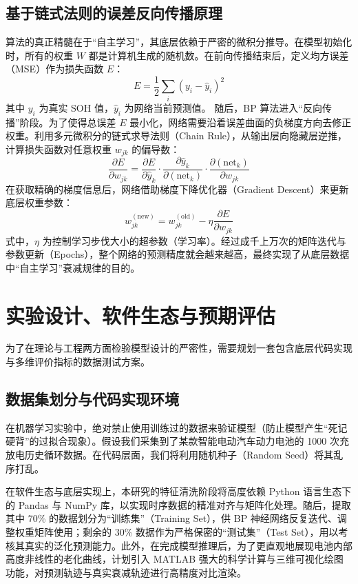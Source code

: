 \documentclass[10pt, a4paper, twocolumn]{ctexart}
\begin{document}
\subsection{基于链式法则的误差反向传播原理}
算法的真正精髓在于“自主学习”，其底层依赖于严密的微积分推导。在模型初始化时，所有的权重 $W$ 都是计算机生成的随机数。在前向传播结束后，定义均方误差（MSE）作为损失函数 $E$：
\begin{equation}
    E = \frac{1}{2} \sum_{i} (y_i - \hat{y}_i)^2 
\end{equation}
其中 $y_i$ 为真实 SOH 值，$\hat{y}_i$ 为网络当前预测值。
随后，BP 算法进入“反向传播”阶段。为了使得总误差 $E$ 最小化，网络需要沿着误差曲面的负梯度方向去修正权重。利用多元微积分的链式求导法则（Chain Rule），从输出层向隐藏层逆推，计算损失函数对任意权重 $w_{jk}$ 的偏导数：
\begin{equation}
    \frac{\partial E}{\partial w_{jk}} = \frac{\partial E}{\partial \hat{y}_k} \cdot \frac{\partial \hat{y}_k}{\partial (\text{net}_k)} \cdot \frac{\partial (\text{net}_k)}{\partial w_{jk}} 
\end{equation}
在获取精确的梯度信息后，网络借助梯度下降优化器（Gradient Descent）来更新底层权重参数：
\begin{equation}
    w_{jk}^{(\text{new})} = w_{jk}^{(\text{old})} - \eta \frac{\partial E}{\partial w_{jk}} 
\end{equation}
式中，$\eta$ 为控制学习步伐大小的超参数（学习率）。经过成千上万次的矩阵迭代与参数更新（Epochs），整个网络的预测精度就会越来越高，最终实现了从底层数据中“自主学习”衰减规律的目的。

\section{实验设计、软件生态与预期评估}
为了在理论与工程两方面检验模型设计的严密性，需要规划一套包含底层代码实现与多维评价指标的数据测试方案。

\subsection{数据集划分与代码实现环境}
在机器学习实验中，绝对禁止使用训练过的数据来验证模型（防止模型产生“死记硬背”的过拟合现象）。假设我们采集到了某款智能电动汽车动力电池的 1000 次充放电历史循环数据。在代码层面，我们将利用随机种子（Random Seed）将其乱序打乱。

在软件生态与底层实现上，本研究的特征清洗阶段将高度依赖 Python 语言生态下的 Pandas 与 NumPy 库，以实现时序数据的精准对齐与矩阵化处理。随后，提取其中 70\% 的数据划分为“训练集”（Training Set），供 BP 神经网络反复迭代、调整权重矩阵使用；剩余的 30\% 数据作为严格保密的“测试集”（Test Set），用以考核其真实的泛化预测能力。此外，在完成模型推理后，为了更直观地展现电池内部高度非线性的老化曲线，计划引入 MATLAB 强大的科学计算与三维可视化绘图功能，对预测轨迹与真实衰减轨迹进行高精度对比渲染。
\end{document}
